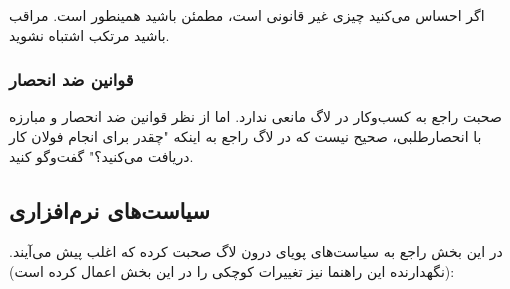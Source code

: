 
اگر احساس می‌کنید چیزی غیر قانونی است، مطمئن باشید همینطور است. مراقب باشید مرتکب اشتباه نشوید.

\subsubsection{قوانین ضد انحصار}
صحبت راجع به کسب‌وکار در لاگ مانعی ندارد. اما از نظر قوانین ضد انحصار و مبارزه با انحصارطلبی، صحیح نیست
که در لاگ راجع به اینکه "چقدر برای انجام فولان کار دریافت می‌کنید؟" گفت‌وگو کنید.

\subsection{سیاست‌های نرم‌افزاری}
در این بخش راجع به سیاست‌های پویای درون لاگ صحبت کرده که اغلب پیش می‌آیند.
(نگهدارنده این راهنما نیز تغییرات کوچکی را در این بخش اعمال کرده است):


